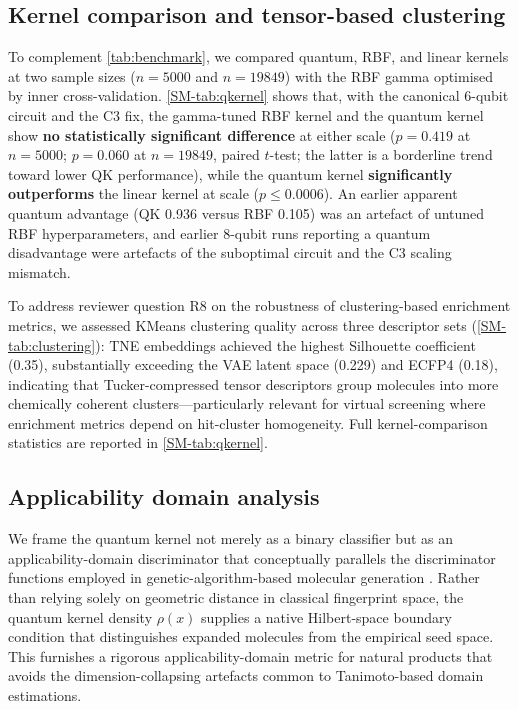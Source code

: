 \documentclass[11pt,a4paper]{article}
\begin{document}
\subsection{Kernel comparison and tensor-based clustering}\label{sec:tensor_clustering}

To complement \cref{tab:benchmark}, we compared quantum, RBF, and linear kernels at two sample sizes ($n = \num{5000}$ and $n = \num{19849}$) with the RBF gamma optimised by inner cross-validation. \cref{SM-tab:qkernel} shows that, with the canonical 6-qubit circuit and the C3 fix, the gamma-tuned RBF kernel and the quantum kernel show \textbf{no statistically significant difference} at either scale ($p = \num{0.419}$ at $n = \num{5000}$; $p = \num{0.060}$ at $n = \num{19849}$, paired $t$-test; the latter is a borderline trend toward lower QK performance), while the quantum kernel \textbf{significantly outperforms} the linear kernel at scale ($p \leq \num{0.0006}$). An earlier apparent quantum advantage (QK \num{0.936} versus RBF \num{0.105}) was an artefact of untuned RBF hyperparameters, and earlier 8-qubit runs reporting a quantum disadvantage were artefacts of the suboptimal circuit and the C3 scaling mismatch.

To address reviewer question R8 on the robustness of clustering-based enrichment metrics, we assessed KMeans clustering quality across three descriptor sets (\cref{SM-tab:clustering}): TNE embeddings achieved the highest Silhouette coefficient (\num{0.35}), substantially exceeding the VAE latent space (\num{0.229}) and ECFP4 (\num{0.18}), indicating that Tucker-compressed tensor descriptors group molecules into more chemically coherent clusters---particularly relevant for virtual screening where enrichment metrics depend on hit-cluster homogeneity. Full kernel-comparison statistics are reported in \cref{SM-tab:qkernel}.

\subsection{Applicability domain analysis}\label{sec:applicability_domain}

We frame the quantum kernel not merely as a binary classifier but as an applicability-domain discriminator that conceptually parallels the discriminator functions employed in genetic-algorithm-based molecular generation \citep{jensen2019augmenting}. Rather than relying solely on geometric distance in classical fingerprint space, the quantum kernel density $\rho(x)$ supplies a native Hilbert-space boundary condition that distinguishes expanded molecules from the empirical seed space. This furnishes a rigorous applicability-domain metric for natural products that avoids the dimension-collapsing artefacts common to Tanimoto-based domain estimations.
\end{document}
